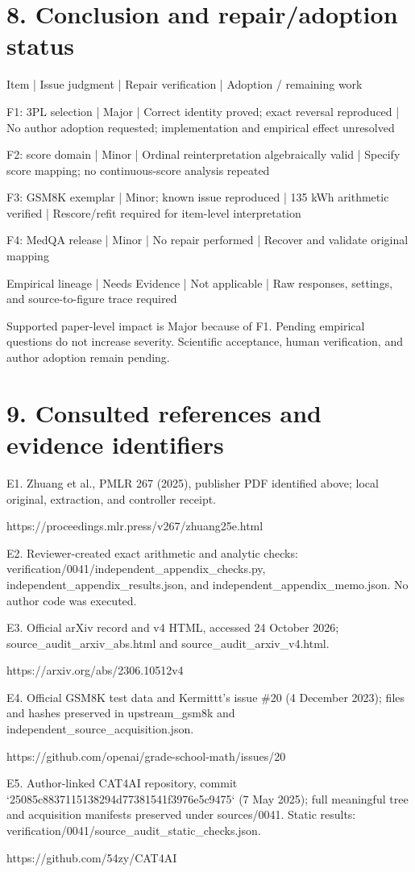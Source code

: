 \documentclass[10pt]{article}
\begin{document}
\section*{8. Conclusion and repair/adoption status}
Item | Issue judgment | Repair verification | Adoption / remaining work\par
F1: 3PL selection | Major | Correct identity proved; exact reversal reproduced | No author adoption requested; implementation and empirical effect unresolved\par
F2: score domain | Minor | Ordinal reinterpretation algebraically valid | Specify score mapping; no continuous-score analysis repeated\par
F3: GSM8K exemplar | Minor; known issue reproduced | 135 kWh arithmetic verified | Rescore/refit required for item-level interpretation\par
F4: MedQA release | Minor | No repair performed | Recover and validate original mapping\par
Empirical lineage | Needs Evidence | Not applicable | Raw responses, settings, and source-to-figure trace required\par
Supported paper-level impact is Major because of F1. Pending empirical questions do not increase severity. Scientific acceptance, human verification, and author adoption remain pending.\par
\section*{9. Consulted references and evidence identifiers}
E1. Zhuang et al., PMLR 267 (2025), publisher PDF identified above; local original, extraction, and controller receipt.\par
https://proceedings.mlr.press/v267/zhuang25e.html\par
E2. Reviewer-created exact arithmetic and analytic checks: verification/0041/independent\_appendix\_checks.py, independent\_appendix\_results.json, and independent\_appendix\_memo.json. No author code was executed.\par
E3. Official arXiv record and v4 HTML, accessed 24 October 2026; source\_audit\_arxiv\_abs.html and source\_audit\_arxiv\_v4.html.\par
https://arxiv.org/abs/2306.10512v4\par
E4. Official GSM8K test data and Kermittt’s issue \#20 (4 December 2023); files and hashes preserved in upstream\_gsm8k and independent\_source\_acquisition.json.\par
https://github.com/openai/grade-school-math/issues/20\par
E5. Author-linked CAT4AI repository, commit `25085c8837115138294d77381541f3976e5c9475` (7 May 2025); full meaningful tree and acquisition manifests preserved under sources/0041. Static results: verification/0041/source\_audit\_static\_checks.json.\par
https://github.com/54zy/CAT4AI\par
\end{document}
